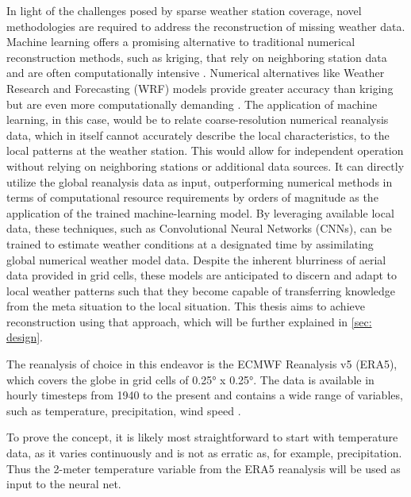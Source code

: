 
In light of the challenges posed by sparse weather station coverage, novel methodologies are required to address the reconstruction of missing weather data.
Machine learning offers a promising alternative to traditional numerical reconstruction methods, such as kriging, that rely on neighboring station data and are often computationally intensive \cite{chung2019kriging}. Numerical alternatives like Weather Research and Forecasting (WRF) models provide greater accuracy than kriging but are even more computationally demanding \cite{skamarock2008wrf}.
The application of machine learning, in this case, would be to relate coarse-resolution numerical reanalysis data, which in itself cannot accurately describe the local characteristics, to the local patterns at the weather station.
This would allow for independent operation without relying on neighboring stations or additional data sources. It can directly utilize the global reanalysis data as input, outperforming numerical methods in terms of computational resource requirements by orders of magnitude \cite{kurth2023MLperformance,bi2023MLperformance,lam2023MLperformance} as the application of the trained machine-learning model.
By leveraging available local data, these techniques, such as Convolutional Neural Networks (CNNs), can be trained to estimate weather conditions at a designated time by assimilating global numerical weather model data.
Despite the inherent blurriness of aerial data provided in grid cells, these models are anticipated to discern and adapt to local weather patterns such that they become capable of transferring knowledge from the meta situation to the local situation.
This thesis aims to achieve reconstruction using that approach, which will be further explained in \autoref{sec: design}.


The reanalysis of choice in this endeavor is the ECMWF Reanalysis v5 (ERA5), which covers the globe in grid cells of 0.25° x 0.25°.
The data is available in hourly timesteps from 1940 to the present and contains a wide range of variables, such as temperature, precipitation, wind speed \cite{era5}.

To prove the concept, it is likely most straightforward to start with temperature data, as it varies continuously and is not as erratic as, for example, precipitation. Thus the 2-meter temperature variable from the ERA5 reanalysis will be used as input to the neural net.

